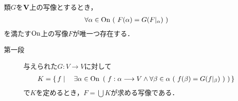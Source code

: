 	\begin{screen}
		\begin{thm}[超限帰納法による写像の構成]\label{thm:transfinite_recursion_theorem}
			類$G$を$\mathbf{V}$上の写像とするとき，
			\begin{align}
				\forall \alpha \in \mathrm{On}\ (\ F(\alpha) = G(F|_\alpha)\ )
			\end{align}
			を満たす$\mathrm{On}$上の写像$F$が唯一つ存在する．
		\end{thm}
	\end{screen}
	
	\begin{prf}\mbox{}
		\begin{description}
			\item[第一段] 与えられた$G:V \longrightarrow V$に対して
				\begin{align}
					K = \left\{\, f \mid \quad \exists \alpha \in \mathrm{On}\ \left(\ f:\alpha \longrightarrow V \wedge \forall \beta \in \alpha\ (\ f(\beta) = G(f|_\beta)\ )\ \right)\, \right\}
				\end{align}
				で$K$を定めるとき，$F = \bigcup K$が求める写像である．
				

\end{description}
\end{prf}
